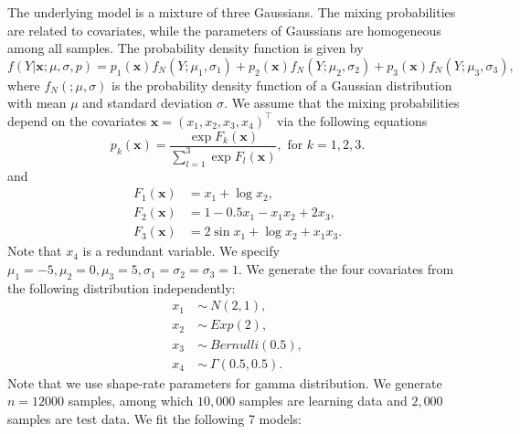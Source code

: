 \documentclass[11pt]{article}
\numberwithin{equation}{section}
\def\bx{\boldsymbol{x}}
\begin{document}
The underlying model is a mixture of three Gaussians. The mixing probabilities are related to covariates, while the parameters of Gaussians are homogeneous among all samples.
The probability density function is given by
\begin{equation}
f(Y|\bx; \mu,\sigma,p)=p_1(\bx)f_N(Y;\mu_1,\sigma_1)+p_2(\bx)f_N(Y;\mu_2,\sigma_2)+p_3(\bx)f_N(Y;\mu_3,\sigma_3),
\end{equation}
where $f_N(;\mu,\sigma)$ is the probability density function of a Gaussian distribution with mean $\mu$ and standard deviation $\sigma$.
We assume that the mixing probabilities depend on the covariates $\bx=(x_1,x_2,x_3,x_4)^\top$ via the following equations
\begin{equation}\label{logistic}
	p_k(\bx)=\frac{\exp{F_k(\bx)}}{\sum_{l=1}^{3}\exp{F_l(\bx)}}, \text{ for } k=1,2,3.
\end{equation}
and 
\begin{align*}
F_1(\bx)&=x_1+\log x_2,\\
 F_2(\bx)&=1-0.5x_1-x_1x_2+2x_3, \\
  F_3(\bx)&=2\sin x_1+\log x_2 + x_1x_3.
	\end{align*}
Note that $x_4$ is a redundant variable. We specify $\mu_1=-5,\mu_2=0,\mu_3=5, \sigma_1=\sigma_2=\sigma_3=1$. We generate the four covariates from the following distribution independently:
   \begin{align*}
   	x_1~&\sim~ N(2,1),\\
   	x_2~&\sim~ Exp(2), \\
   	x_3~&\sim~ Bernulli(0.5), \\
   	x_4~&\sim~ \Gamma(0.5,0.5).
   \end{align*}
Note that we use shape-rate parameters for gamma distribution.
We generate $n=12000$ samples, among which $10,000$ samples are learning data and $2,000$ samples are test data.
We fit the following 7 models:
\end{document}
